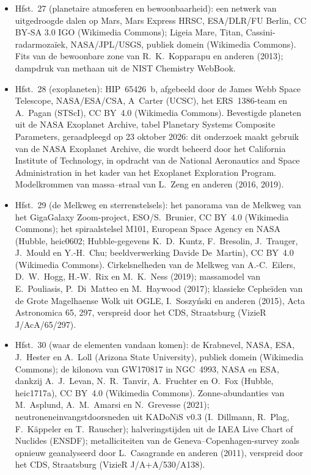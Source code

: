 \begin{itemize}
  \item Hfst.~27 (planetaire atmosferen en bewoonbaarheid): een netwerk van uitgedroogde dalen op Mars, Mars Express HRSC, ESA/DLR/FU Berlin, CC BY-SA 3.0 IGO (Wikimedia Commons); Ligeia Mare, Titan, Cassini-radarmozaïek, NASA/JPL/USGS, publiek domein (Wikimedia Commons). Fits van de bewoonbare zone van R.~K.~Kopparapu en anderen (2013); dampdruk van methaan uit de NIST Chemistry WebBook.
  \item Hfst.~28 (exoplaneten): HIP~65426~b, afgebeeld door de James Webb Space Telescope, NASA/ESA/CSA, A~Carter (UCSC), het ERS~1386-team en A.~Pagan (STScI), CC BY~4.0 (Wikimedia Commons). Bevestigde planeten uit de NASA Exoplanet Archive, tabel Planetary Systems Composite Parameters, geraadpleegd op 23 oktober 2026: dit onderzoek maakt gebruik van de NASA Exoplanet Archive, die wordt beheerd door het California Institute of Technology, in opdracht van de National Aeronautics and Space Administration in het kader van het Exoplanet Exploration Program. Modelkrommen van massa--straal van L.~Zeng en anderen (2016, 2019).
  \item Hfst.~29 (de Melkweg en sterrenstelsels): het panorama van de Melkweg van het GigaGalaxy Zoom-project, ESO/S.~Brunier, CC BY~4.0 (Wikimedia Commons); het spiraalstelsel M101, European Space Agency en NASA (Hubble, heic0602; Hubble-gegevens K.~D.~Kuntz, F.~Bresolin, J.~Trauger, J.~Mould en Y.-H.~Chu; beeldverwerking Davide De~Martin), CC BY~4.0 (Wikimedia Commons). Cirkelsnelheden van de Melkweg van A.-C.~Eilers, D.~W.~Hogg, H.-W.~Rix en M.~K.~Ness (2019); massamodel van E.~Pouliasis, P.~Di~Matteo en M.~Haywood (2017); klassieke Cepheïden van de Grote Magelhaense Wolk uit OGLE, I.~Soszy\'nski en anderen (2015), Acta Astronomica 65, 297, verspreid door het CDS, Straatsburg (VizieR J/AcA/65/297).
  \item Hfst.~30 (waar de elementen vandaan komen): de Krabnevel, NASA, ESA, J.~Hester en A.~Loll (Arizona State University), publiek domein (Wikimedia Commons); de kilonova van GW170817 in NGC~4993, NASA en ESA, dankzij A.~J.~Levan, N.~R.~Tanvir, A.~Fruchter en O.~Fox (Hubble, heic1717a), CC BY~4.0 (Wikimedia Commons). Zonne-abundanties van M.~Asplund, A.~M.~Amarsi en N.~Grevesse (2021); neutroneneinvangstdoorsneden uit KADoNiS v0.3 (I.~Dillmann, R.~Plag, F.~K\"appeler en T.~Rauscher); halveringstijden uit de IAEA Live Chart of Nuclides (ENSDF); metalliciteiten van de Geneva--Copenhagen-survey zoals opnieuw geanalyseerd door L.~Casagrande en anderen (2011), verspreid door het CDS, Straatsburg (VizieR J/A+A/530/A138).
\end{itemize}
